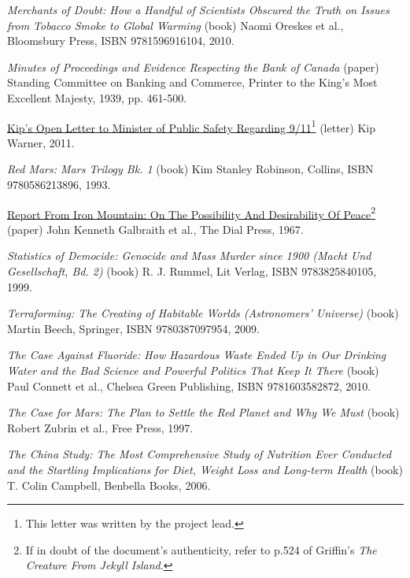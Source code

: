 \item
{\it Merchants of Doubt: How a Handful of Scientists Obscured the Truth on Issues from Tobacco Smoke to Global Warming} (book)\crlf
Naomi Oreskes et al., Bloomsbury Press, ISBN 9781596916104, 2010.

\item
{\it Minutes of Proceedings and Evidence Respecting the Bank of Canada} (paper)\crlf
Standing Committee on Banking and Commerce, Printer to the King's Most Excellent Majesty, 1939, pp. 461-500.

\item
\href{http://www.thevertigo.com/html/9-11/}{Kip's Open Letter to Minister of Public Safety Regarding 9/11}\footnote{This letter was written by the project lead.} (letter)\crlf
Kip Warner, 2011.

\item
{\it Red Mars: Mars Trilogy Bk. 1} (book)\crlf
Kim Stanley Robinson, Collins, ISBN 9780586213896, 1993.

\item
\href{http://www.teachpeace.com/Report_from_Iron_Mountain.pdf}{Report From Iron Mountain: On The Possibility And Desirability Of Peace}\footnote{If in doubt of the document's authenticity, refer to p.524 of Griffin's {\it The Creature From Jekyll Island}.} (paper)\crlf
John Kenneth Galbraith et al., The Dial Press, 1967.

\item
{\it Statistics of Democide: Genocide and Mass Murder since 1900 (Macht Und Gesellschaft, Bd. 2)} (book)\crlf
R. J. Rummel, Lit Verlag, ISBN 9783825840105, 1999.

\item
{\it Terraforming: The Creating of Habitable Worlds (Astronomers' Universe)} (book)\crlf
Martin Beech, Springer, ISBN 9780387097954, 2009.

\item
{\it The Case Against Fluoride: How Hazardous Waste Ended Up in Our Drinking Water and the Bad Science and Powerful Politics That Keep It There} (book)\crlf
Paul Connett et al., Chelsea Green Publishing, ISBN 9781603582872, 2010.

\item
{\it The Case for Mars: The Plan to Settle the Red Planet and Why We Must} (book)\crlf
Robert Zubrin et al., Free Press, 1997.

\item
{\it The China Study: The Most Comprehensive Study of Nutrition Ever Conducted and the Startling Implications for Diet, Weight Loss and Long-term Health} (book)\crlf
T. Colin Campbell, Benbella Books, 2006.

